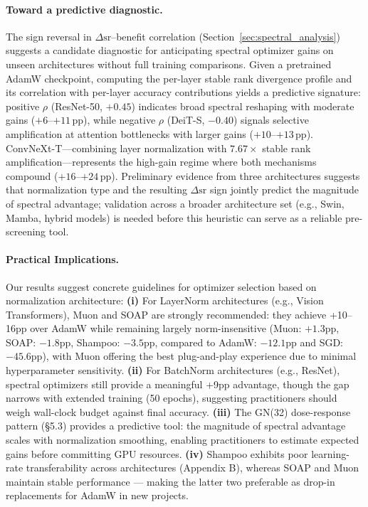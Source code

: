 \paragraph{Toward a predictive diagnostic.}
The sign reversal in $\Delta \mathrm{sr}$--benefit correlation (Section~\ref{sec:spectral_analysis}) suggests a candidate diagnostic for anticipating spectral optimizer gains on unseen architectures without full training comparisons.
Given a pretrained AdamW checkpoint, computing the per-layer stable rank divergence profile and its correlation with per-layer accuracy contributions yields a predictive signature: positive $\rho$ (ResNet-50, $+0.45$) indicates broad spectral reshaping with moderate gains ($+6$--$+11$\,pp), while negative $\rho$ (DeiT-S, $-0.40$) signals selective amplification at attention bottlenecks with larger gains ($+10$--$+13$\,pp).
ConvNeXt-T---combining layer normalization with $7.67\times$ stable rank amplification---represents the high-gain regime where both mechanisms compound ($+16$--$+24$\,pp).
Preliminary evidence from three architectures suggests that normalization type and the resulting $\Delta \mathrm{sr}$ sign jointly predict the magnitude of spectral advantage; validation across a broader architecture set (e.g., Swin, Mamba, hybrid models) is needed before this heuristic can serve as a reliable pre-screening tool.

\paragraph{Practical Implications.}
Our results suggest concrete guidelines for optimizer selection based on normalization architecture:
\textbf{(i)} For LayerNorm architectures (e.g., Vision Transformers), Muon and SOAP are strongly recommended: they achieve +10--16pp over AdamW while remaining largely norm-insensitive (Muon: $+1.3$pp, SOAP: $-1.8$pp, Shampoo: $-3.5$pp, compared to AdamW: $-12.1$pp and SGD: $-45.6$pp), with Muon offering the best plug-and-play experience due to minimal hyperparameter sensitivity.
\textbf{(ii)} For BatchNorm architectures (e.g., ResNet), spectral optimizers still provide a meaningful +9pp advantage, though the gap narrows with extended training (50 epochs), suggesting practitioners should weigh wall-clock budget against final accuracy.
\textbf{(iii)} The GN(32) dose-response pattern (§5.3) provides a predictive tool: the magnitude of spectral advantage scales with normalization smoothing, enabling practitioners to estimate expected gains before committing GPU resources.
\textbf{(iv)} Shampoo exhibits poor learning-rate transferability across architectures (Appendix B), whereas SOAP and Muon maintain stable performance --- making the latter two preferable as drop-in replacements for AdamW in new projects.


